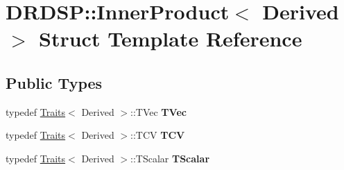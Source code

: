 \hypertarget{struct_d_r_d_s_p_1_1_inner_product}{\section{D\-R\-D\-S\-P\-:\-:Inner\-Product$<$ Derived $>$ Struct Template Reference}
\label{struct_d_r_d_s_p_1_1_inner_product}
}
\subsection*{Public Types}
\begin{DoxyCompactItemize}
\item 
\hypertarget{struct_d_r_d_s_p_1_1_inner_product_a17ea87e68e60f51e48a2744e8a46c958}{typedef \hyperlink{struct_d_r_d_s_p_1_1_traits}{Traits}$<$ Derived $>$\-::T\-Vec {\bfseries T\-Vec}}\label{struct_d_r_d_s_p_1_1_inner_product_a17ea87e68e60f51e48a2744e8a46c958}

\item 
\hypertarget{struct_d_r_d_s_p_1_1_inner_product_af3dad68262d43466e9d3ee914bd70041}{typedef \hyperlink{struct_d_r_d_s_p_1_1_traits}{Traits}$<$ Derived $>$\-::T\-C\-V {\bfseries T\-C\-V}}\label{struct_d_r_d_s_p_1_1_inner_product_af3dad68262d43466e9d3ee914bd70041}

\item 
\hypertarget{struct_d_r_d_s_p_1_1_inner_product_ac4de33c75ca947cc2af0495473dde742}{typedef \hyperlink{struct_d_r_d_s_p_1_1_traits}{Traits}$<$ Derived $>$\-::T\-Scalar {\bfseries T\-Scalar}}\label{struct_d_r_d_s_p_1_1_inner_product_ac4de33c75ca947cc2af0495473dde742}

\end{DoxyCompactItemize}
